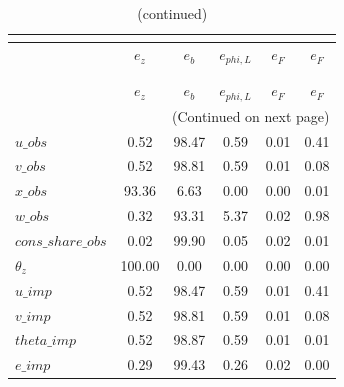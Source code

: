  
\begin{center}
\begin{longtable}{lccccc} 
\caption{VARIANCE DECOMPOSITION (in percent)}\\
 \label{Table:th_var_decomp_uncond}\\
\toprule 
$                   $	 & 	 $          {e_z}$	 & 	 $        {e_{b}}$	 & 	 $    {e_{phi,L}}$	 & 	 $          {e_F}$	 & 	 $          {e_F}$\\
\midrule \endfirsthead 
\caption{(continued)}\\
 \toprule \\ 
$                   $	 & 	 $          {e_z}$	 & 	 $        {e_{b}}$	 & 	 $    {e_{phi,L}}$	 & 	 $          {e_F}$	 & 	 $          {e_F}$\\
\midrule \endhead 
\midrule \multicolumn{6}{r}{(Continued on next page)} \\ \bottomrule \endfoot 
\bottomrule \endlastfoot 
$u\_obs             $	 & 	           0.52	 & 	          98.47	 & 	           0.59	 & 	           0.01	 & 	           0.41 \\ 
$v\_obs             $	 & 	           0.52	 & 	          98.81	 & 	           0.59	 & 	           0.01	 & 	           0.08 \\ 
$x\_obs             $	 & 	          93.36	 & 	           6.63	 & 	           0.00	 & 	           0.00	 & 	           0.01 \\ 
$w\_obs             $	 & 	           0.32	 & 	          93.31	 & 	           5.37	 & 	           0.02	 & 	           0.98 \\ 
$cons\_share\_obs   $	 & 	           0.02	 & 	          99.90	 & 	           0.05	 & 	           0.02	 & 	           0.01 \\ 
${\theta_z}         $	 & 	         100.00	 & 	           0.00	 & 	           0.00	 & 	           0.00	 & 	           0.00 \\ 
$u\_imp             $	 & 	           0.52	 & 	          98.47	 & 	           0.59	 & 	           0.01	 & 	           0.41 \\ 
$v\_imp             $	 & 	           0.52	 & 	          98.81	 & 	           0.59	 & 	           0.01	 & 	           0.08 \\ 
$theta\_imp         $	 & 	           0.52	 & 	          98.87	 & 	           0.59	 & 	           0.01	 & 	           0.01 \\ 
$e\_imp             $	 & 	           0.29	 & 	          99.43	 & 	           0.26	 & 	           0.02	 & 	           0.00 \\ 

\end{longtable}
\end{center}
